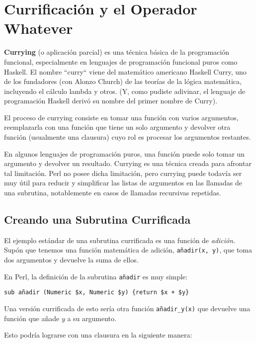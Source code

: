 \section{Currificación y el Operador Whatever}

{\bf Currying} (o aplicación parcial) es una técnica básica
de la programación funcional, especialmente en lenguajes de 
programación funcional puros como Haskell. El nombre ``curry``
viene del matemático americano Haskell Curry, uno de los fundadores
(con Alonzo Church) de las teorías de la lógica matemática, incluyendo
el cálculo lambda y otros. (Y, como pudiste adivinar, el lenguaje de
programación Haskell derivó su nombre del primer nombre de Curry).

El proceso de currying consiste en tomar una función con varios argumentos,
reemplazarla con una función que tiene un solo argumento y devolver otra 
función (usualmente una clausura) cuyo rol es procesar los argumentos
restantes.

En algunos lenguajes de programación puros, una función puede solo
tomar un argumento y devolver un resultado. Currying es una técnica 
creada para afrontar tal limitación. Perl no posee dicha limitación, 
pero currying puede todavía ser muy útil para reducir y simplificar 
las listas de argumentos en las llamadas de una subrutina, notablemente
en casos de llamadas recursivas repetidas.


\subsection{Creando una Subrutina Currificada}

El ejemplo estándar de una subrutina currificada es una 
función de \emph{adición}. Supón que tenemos una función
matemática de adición, \verb|añadir(x, y)|, que toma dos 
argumentos y devuelve la suma de ellos. 

En Perl, la definición de la subrutina {\tt añadir} es
muy simple:

\begin{verbatim}
sub añadir (Numeric $x, Numeric $y) {return $x + $y}
\end{verbatim}

Una versión currificada de esto sería otra función \verb|añadir_y(x)|
que devuelve una función que añade $y$ a su argumento.

Esto podría lograrse con una clausura en la 
siguiente manera:

